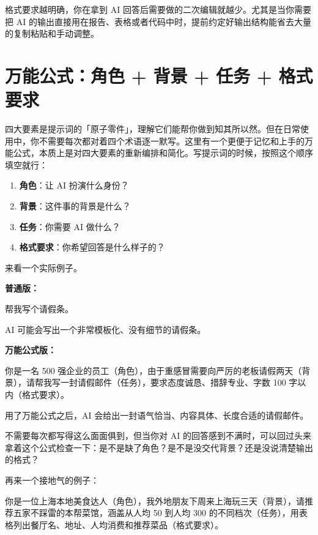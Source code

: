 格式要求越明确，你在拿到 AI 回答后需要做的二次编辑就越少。尤其是当你需要把 AI 的输出直接用在报告、表格或者代码中时，提前约定好输出结构能省去大量的复制粘贴和手动调整。

\section{万能公式：角色 + 背景 + 任务 + 格式要求}
\label{sec:prompt-formula}

四大要素是提示词的「原子零件」，理解它们能帮你做到知其所以然。但在日常使用中，你不需要每次都对着四个术语逐一默写。这里有一个更便于记忆和上手的万能公式，本质上是对四大要素的重新编排和简化。写提示词的时候，按照这个顺序填空就行：

\begin{enumerate}
  \item \textbf{角色}：让 AI 扮演什么身份？
  \item \textbf{背景}：这件事的背景是什么？
  \item \textbf{任务}：你需要 AI 做什么？
  \item \textbf{格式要求}：你希望回答是什么样子的？
\end{enumerate}

来看一个实际例子。

\textbf{普通版：}

\begin{promptbox}
帮我写个请假条。
\end{promptbox}

AI 可能会写出一个非常模板化、没有细节的请假条。

\textbf{万能公式版：}

\begin{promptbox}
你是一名 500 强企业的员工（角色），由于重感冒需要向严厉的老板请假两天（背景），请帮我写一封请假邮件（任务），要求态度诚恳、措辞专业、字数 100 字以内（格式要求）。
\end{promptbox}

用了万能公式之后，AI 会给出一封语气恰当、内容具体、长度合适的请假邮件。

不需要每次都写得这么面面俱到，但当你对 AI 的回答感到不满时，可以回过头来拿着这个公式检查一下：是不是缺了角色？是不是没交代背景？还是没说清楚输出的格式？

再来一个接地气的例子：

\begin{promptbox}
你是一位上海本地美食达人（角色），我外地朋友下周来上海玩三天（背景），请推荐五家不踩雷的本帮菜馆，涵盖从人均 50 到人均 300 的不同档次（任务），用表格列出餐厅名、地址、人均消费和推荐菜品（格式要求）。
\end{promptbox}


